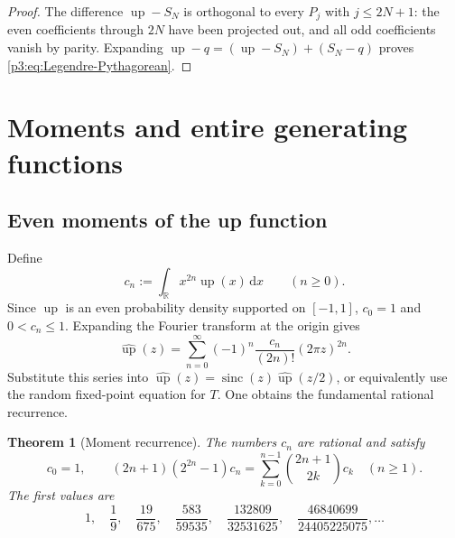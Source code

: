 \documentclass[11pt]{article}
\numberwithin{equation}{section}
\newtheorem{theorem}{Theorem}[section]
\theoremstyle{definition}
\theoremstyle{remark}
\newcommand{\R}{\mathbb R}
\newcommand{\upf}{\operatorname{up}}
\newcommand{\sinc}{\operatorname{sinc}}
\newcommand{\dd}{\,\mathrm d}
\begin{document}
\begin{proof}
The difference $\upf-S_N$ is orthogonal to every $P_j$ with $j\le2N+1$: the even coefficients through $2N$ have been projected out, and all odd coefficients vanish by parity.  Expanding $\upf-q=(\upf-S_N)+(S_N-q)$ proves \eqref{p3:eq:Legendre-Pythagorean}.
\end{proof}


\section{Moments and entire generating functions}\label{p3:sec:moments}

\subsection{Even moments of the up function}

Define
\begin{equation}\label{p3:eq:cndef}
 c_n:=\int_{\R}x^{2n}\upf(x)\dd x\qquad(n\ge0).
\end{equation}
Since $\upf$ is an even probability density supported on $[-1,1]$, $c_0=1$ and $0<c_n\le1$.  Expanding the Fourier transform at the origin gives
\begin{equation}\label{p3:eq:Fourier-moment-series}
 \widehat{\upf}(z)=\sum_{n=0}^{\infty}(-1)^n\frac{c_n}{(2n)!}(2\pi z)^{2n}.
\end{equation}
Substitute this series into $\widehat{\upf}(z)=\sinc(z)\widehat{\upf}(z/2)$, or equivalently use the random fixed-point equation for $T$.  One obtains the fundamental rational recurrence.

\begin{theorem}[Moment recurrence]\label{p3:thm:c-recurrence}
The numbers $c_n$ are rational and satisfy
\begin{equation}\label{p3:eq:c-recurrence}
 c_0=1,
 \qquad
 (2n+1)(2^{2n}-1)c_n
 =\sum_{k=0}^{n-1}\binom{2n+1}{2k}c_k
 \quad(n\ge1).
\end{equation}
The first values are
\begin{equation}\label{p3:eq:c-values}
 1,\quad \frac19,\quad \frac{19}{675},\quad
 \frac{583}{59535},\quad \frac{132809}{32531625},\quad
 \frac{46840699}{24405225075},\ldots
\end{equation}
\end{theorem}
\end{document}
